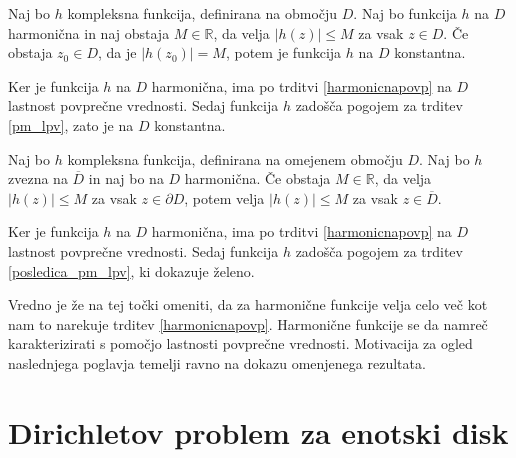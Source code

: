 \documentclass[mat1, tisk]{fmfdelo}
\begin{document}
    \begin{posledica}
        \label{pm_harm}
        Naj bo $h$ kompleksna funkcija, definirana na območju $D$. Naj bo funkcija $h$ na $D$ harmonična in naj obstaja $M \in \mathbb{R}$, da velja $|h(z)| \leq M$ za vsak $z \in D$. 
        Če obstaja $z_0 \in D$, da je $|h(z_0)| = M$, potem je funkcija $h$ na $D$ konstantna.  
    \end{posledica}
    \begin{dokaz}
        Ker je funkcija $h$ na $D$ harmonična, ima po trditvi \ref{harmonicnapovp} na $D$ lastnost povprečne vrednosti. Sedaj funkcija $h$ zadošča pogojem za trditev \ref{pm_lpv}, zato je na $D$ konstantna.
    \end{dokaz}

    \begin{posledica}
        Naj bo $h$ kompleksna funkcija, definirana na omejenem območju $D$. Naj bo $h$ zvezna na $\overline{D}$ in naj bo na $D$ harmonična. 
        Če obstaja $M \in \mathbb{R}$, da velja $|h(z)| \leq M$ za vsak $z \in \partial D$, potem velja $|h(z)| \leq M$ za vsak $z \in \overline{D}$. 
    \end{posledica}
    \begin{dokaz}
        Ker je funkcija $h$ na $D$ harmonična, ima po trditvi \ref{harmonicnapovp} na $D$ lastnost povprečne vrednosti. Sedaj funkcija $h$ zadošča pogojem za trditev \ref{posledica_pm_lpv}, ki dokazuje želeno.
    \end{dokaz}

    Vredno je že na tej točki omeniti, da za harmonične funkcije velja celo več kot nam to narekuje trditev \ref{harmonicnapovp}. 
    Harmonične funkcije se da namreč karakterizirati s pomočjo lastnosti povprečne vrednosti. 
    Motivacija za ogled naslednjega poglavja temelji ravno na dokazu omenjenega rezultata. 

\section{Dirichletov problem za enotski disk}
\end{document}
